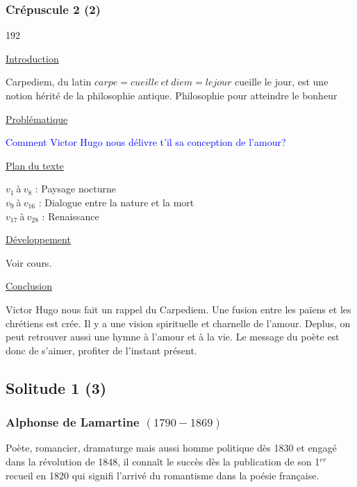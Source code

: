 \documentclass[12pt,a4paper]{article}
\begin{document}
				\subsubsection{Cr\'epuscule 2 (2)}

\begin{dingautolist}{192}

\item \underline{Introduction} \par
	Carpediem, du latin $carpe = cueille~et~diem = le jour$ cueille le jour, est une notion h\'erit\'e de la philosophie antique. Philosophie pour atteindre le bonheur 

\item \underline{Probl\'ematique }\par
		\textcolor{blue}{Comment Victor Hugo nous d\'elivre t'il sa conception de l'amour?}

\item \underline{Plan du texte} \par
		$v_{1}~$\`a$~v_{8}$ : Paysage nocturne\\
        $v_{9}~$\`a$~v_{16}$ : Dialogue entre la nature et la mort\\
        $v_{17}~$\`a$~v_{28}$ : Renaissance

\item \underline{D\'eveloppement} \par
	Voir cours.

\item \underline{Conclusion} \par
	Victor Hugo nous fait un rappel du Carpediem.
Une fusion entre les pa\"iens et les chr\'etiens est cr\'ee. Il y a une vision spirituelle et charnelle de l'amour. Deplus, on peut retrouver aussi une hymne \`a l'amour et \`a la vie.
Le message du po\`ete est donc de s'aimer, profiter de l'instant pr\'esent. 

\end{dingautolist}	

 \newpage
			\subsection{Solitude 1 (3)}
				\subsubsection{Alphonse de Lamartine $(1790-1869)$}
		Po\`ete, romancier, dramaturge mais aussi homme politique d\`es 1830 et engag\'e dans la r\'evolution de 1848, il conna\^it le succ\`es d\`es la publication de son 1$^{er}$ recueil en 1820 
		qui signifi l'arriv\'e du romantisme dans la po\'esie fran\c caise.
\end{document}
